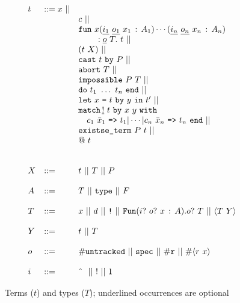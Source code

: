 \documentclass[9pt,natbib]{sigplanconf}
\newcommand{\Eq}[0]{\texttt{=}}
\newcommand{\bang}[0]{\texttt{!}}
\begin{document}
\begin{figure}
\[
\begin{array}{lll}
t & ::= x\ ||\\
\ & \ &   c\ ||\\ 
\ & \ &    \texttt{fun}\ x(\underline{i_1}\ \underline{o_1}\ x_1\,:\,A_1)\cdots(\underline{i_n}\ \underline{o_n}\ x_n\,:\, A_n)\\
\ & \ & \ \ \ \ \ \ \  : \underline{o}\ T .\ t\ ||\\
\ & \ &    (t\ X)\ || \\ 
\ & \ &         \texttt{cast}\ t\ \texttt{by}\ P  \ ||\\
\ & \ &  \texttt{abort}\ T\ ||\\ 
\ & \ &  \texttt{impossible}\ P\ T\ ||\\ 
\ & \ &  \texttt{do}\ t_1\ \ldots\ t_n\ \texttt{end}\ ||\\ 
\ & \ &  \texttt{let}\ x\ \Eq\ t\ \texttt{by}\ y\ \texttt{in}\ t' \ ||\ 
\\ 
\ & \ &  \texttt{match}\, \underline{!}\ t\ \texttt{by}\ x\ y \ \texttt{with}\\
\ & \ &  \ \ \ c_1\ \bar{x}_1\ \texttt{=>}\ t_1 |
 \cdots | c_n\ \bar{x}_n\ \texttt{=>}\ t_n\ \texttt{end}\ ||\\
\ & \ &  \texttt{existse\_term}\ P\ t\ || \\
\ & \ &  @\ t \\
\\
\\
X & ::= & t\ ||\ T\ ||\ P
\\
\\
A & ::= & T\ ||\ \texttt{type}\ ||\ F 
\\
\\
T & ::= & x\ ||\ d\ ||\ \bang\ ||\ 
     \texttt{Fun}(i?\ o?\ x\,:\,A) . o?\ T\ ||\ \langle T\ Y\rangle 
\\
\\
Y & ::= & t\ ||\ T
\\
\\
o & ::= & \#\texttt{untracked}\ ||\ \texttt{spec}\ ||\ \#\texttt{r}\ ||\ \#\langle r\ x\rangle
\\
\\
i & ::= & \textnormal{\^{\ }}\ ||\ !\ ||\ 1
\end{array}
\]
\caption{\label{fig:terms} Terms ($t$) and types ($T$); underlined occurrences are optional}
\end{figure}
\end{document}
